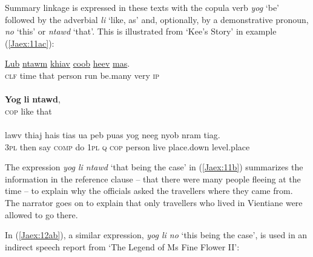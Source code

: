 \documentclass[output=paper]{LSP/langsci}
\begin{document}
Summary linkage is expressed in these texts with the copula verb \textit{yog} `be' followed by the adverbial \textit{li} `like, as' and, optionally, by a demonstrative pronoun, \textit{no} `this' or \textit{ntawd} `that'. This is illustrated from `Kee’s Story' in example (\ref{Jaex:11ac}):
 
\begin{exe}
\ex \label{Jaex:11ac}
\begin{xlist}
\ex \label{Jaex:11a}
\gll \underline{Lub} \underline{} \underline{ntawm} \underline{} \underline{khiav} \underline{coob}     \underline{heev} \underline{mas}.        \\
\textsc{clf} time that person run be.many very \textsc{ip}\\
\glt {}\\
\ex \label{Jaex:11b}
\gll   \textbf{Yog} \textbf{li} \textbf{ntawd},\\
\textsc{cop} like that\\
\glt {}\\
\ex \label{Jaex:11c}
\gll lawv  thiaj hais tias ua  peb puas yog neeg nyob nram   tiag.\\     	      
     3\textsc{pl} then say \textsc{comp} do 1\textsc{pl} \textsc{q} \textsc{cop} person live place.down level.place\\
\glt {} \citep[][227]{fuller85}
\end{xlist}
\end{exe}

\noindent
The expression \textit{yog li ntawd} `that being the case' in (\ref{Jaex:11b}) summarizes the information in the reference clause – that there were many people fleeing at the time – to explain why the officials asked the travellers where they came from. The narrator goes on to explain that only travellers who lived in Vientiane were allowed to go there.
 
In (\ref{Jaex:12ab}), a similar expression, \textit{yog li no} `this being the case', is used in an indirect speech report from `The Legend of Ms Fine Flower II':
 
\end{document}
